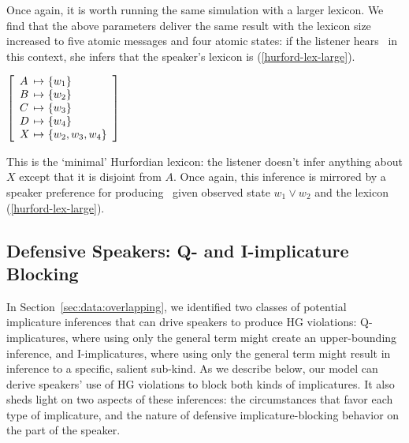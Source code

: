 \documentclass[12pt,twoside]{article}
\newcommand{\secref}[1]{Section~\ref{#1}}
\newcommand{\eg}[1]{(\ref{#1})}
\newcommand{\set}[1]{\ensuremath{\left\{ #1 \right\}}}
\renewcommand{\_}{\textbf{\textunderscore\hspace{-4pt}\textunderscore\hspace{-3pt}\textunderscore\hspace{-4pt}\textunderscore}\hspace{0.5pt}}			%
\begin{document}
Once again, it is worth running the same simulation with a larger
lexicon. We find that the above parameters deliver the same result
with the lexicon size increased to five atomic messages and four
atomic states: if the listener hears \AorX\ in this context,
she infers that the speaker's lexicon is \eg{hurford-lex-large}.
%
\begin{exe}
\ex\label{hurford-lex-large}  
  $\left[
    \begin{array}[c]{l@{ \ \mapsto \ }l}
      A & \set{w_{1}} \\
      B & \set{w_{2}} \\
      C & \set{w_{3}} \\
      D & \set{w_{4}} \\
      X & \set{w_{2}, w_{3}, w_{4}}
    \end{array}
  \right]$
\end{exe}
%
This is the `minimal' Hurfordian lexicon: the listener doesn't infer
anything about $X$ except that it is disjoint from $A$. Once again,
this inference is mirrored by a speaker preference for producing
\AorX\ given observed state $w_{1} \vee w_{2}$ and the lexicon
\eg{hurford-lex-large}.


\subsection{Defensive Speakers: Q- and I-implicature Blocking}
\label{sec:defensive-speakers}

In \secref{sec:data:overlapping}, we identified two classes of
potential implicature inferences that can drive speakers to produce HG
violations: Q-implicatures, where using only the general term might
create an upper-bounding inference, and I-implicatures, where using
only the general term might result in inference to a specific, salient
sub-kind. As we describe below, our model can derive speakers' use of
HG violations to block both kinds of implicatures. It also sheds light
on two aspects of these inferences: the circumstances that favor each
type of implicature, and the nature of defensive implicature-blocking
behavior on the part of the speaker.
\end{document}
